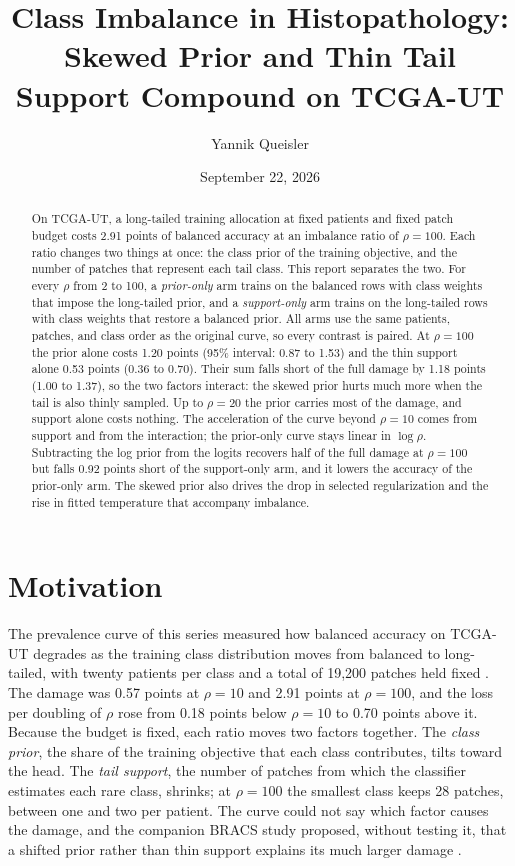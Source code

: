 \documentclass[11pt]{article}
\title{Class Imbalance in Histopathology:\\Skewed Prior and Thin Tail Support Compound on TCGA-UT}
\author{Yannik Queisler}
\date{September 22, 2026}
\begin{document}
\raggedbottom
{}
\setlength{\emergencystretch}{2em}
\maketitle
\begin{abstract}
\noindent On TCGA-UT, a long-tailed training allocation at fixed patients and fixed patch budget costs 2.91 points of balanced accuracy at an imbalance ratio of $\rho=100$. Each ratio changes two things at once: the class prior of the training objective, and the number of patches that represent each tail class. This report separates the two. For every $\rho$ from 2 to 100, a \emph{prior-only} arm trains on the balanced rows with class weights that impose the long-tailed prior, and a \emph{support-only} arm trains on the long-tailed rows with class weights that restore a balanced prior. All arms use the same patients, patches, and class order as the original curve, so every contrast is paired. At $\rho=100$ the prior alone costs 1.20 points (95\% interval: 0.87 to 1.53) and the thin support alone 0.53 points (0.36 to 0.70). Their sum falls short of the full damage by 1.18 points (1.00 to 1.37), so the two factors interact: the skewed prior hurts much more when the tail is also thinly sampled. Up to $\rho=20$ the prior carries most of the damage, and support alone costs nothing. The acceleration of the curve beyond $\rho=10$ comes from support and from the interaction; the prior-only curve stays linear in $\log\rho$. Subtracting the log prior from the logits recovers half of the full damage at $\rho=100$ but falls 0.92 points short of the support-only arm, and it lowers the accuracy of the prior-only arm. The skewed prior also drives the drop in selected regularization and the rise in fitted temperature that accompany imbalance.
\end{abstract}

\section{Motivation}
\label{sec:motivation}
The prevalence curve of this series measured how balanced accuracy on TCGA-UT degrades as the training class distribution moves from balanced to long-tailed, with twenty patients per class and a total of 19,200 patches held fixed \citep{queisler2026prevalenceTcga}. The damage was 0.57 points at $\rho=10$ and 2.91 points at $\rho=100$, and the loss per doubling of $\rho$ rose from 0.18 points below $\rho=10$ to 0.70 points above it. Because the budget is fixed, each ratio moves two factors together. The \emph{class prior}, the share of the training objective that each class contributes, tilts toward the head. The \emph{tail support}, the number of patches from which the classifier estimates each rare class, shrinks; at $\rho=100$ the smallest class keeps 28 patches, between one and two per patient. The curve could not say which factor causes the damage, and the companion BRACS study proposed, without testing it, that a shifted prior rather than thin support explains its much larger damage \citep{queisler2026prevalenceBracs}.
\end{document}
